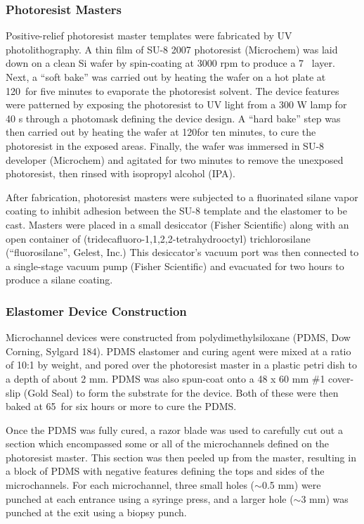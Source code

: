 \subsubsection{Photoresist Masters}
Positive-relief photoresist master templates were fabricated by UV photolithography. A thin film
of SU-8 2007 photoresist (Microchem) was laid down on a clean Si wafer by spin-coating at 3000 rpm to produce a 
7 \microns~layer. Next, a ``soft bake'' was carried out by heating the wafer on a hot plate at 
120\degC~for five minutes to evaporate the photoresist solvent.  The device features were patterned by exposing the 
photoresist to UV light from a 300 W lamp for 40 s through a photomask defining the device design. A ``hard bake'' step
was then carried out by heating the wafer at 120\degC for ten minutes, to cure the photoresist in the exposed areas.
Finally, the wafer was immersed in SU-8 developer (Microchem) and agitated for two minutes to remove the unexposed
photoresist, then rinsed with isopropyl alcohol (IPA).

After fabrication, photoresist masters were subjected to a fluorinated silane vapor coating to inhibit adhesion
between the SU-8 template and the elastomer to be cast. Masters were placed in a small desiccator (Fisher Scientific)
along with an open container of (tridecafluoro-1,1,2,2-tetrahydrooctyl) trichlorosilane (``fluorosilane'', Gelest, Inc.)
This desiccator's vacuum port was then connected to a single-stage vacuum pump 
(Fisher Scientific) and evacuated for two hours to produce
a silane coating.

\subsubsection{Elastomer Device Construction}

Microchannel devices were constructed from polydimethylsiloxane (PDMS, Dow Corning, Sylgard 184). PDMS
elastomer and curing agent were mixed at a ratio of 10:1 by weight, and pored over the photoresist master 
in a plastic petri dish to a depth of about 2 mm.  PDMS was also spun-coat onto a 48 x 60 mm \#1 cover-slip (Gold Seal)
to form the substrate for the device.
Both of these  were then baked at 65\degC~for six hours or more to cure
the PDMS.  

Once the PDMS was fully cured, a razor blade was used to carefully cut out a section which encompassed some or all of
the microchannels defined on the photoresist master. This section was then peeled up from the master, resulting
in a block of PDMS with negative features defining the tops and sides of the microchannels.
For each microchannel, three small holes ($\sim$0.5 mm) were punched at each entrance using a syringe press, and a larger
hole ($\sim$3 mm) was punched at the exit using a biopsy punch.


